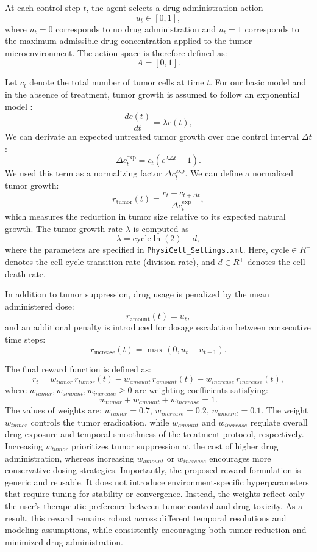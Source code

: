 \documentclass{article}
\begin{document}
At each control step $t$, the agent selects a drug administration action
$$
u_t \in [0,1],
$$
where $u_t = 0$ corresponds to no drug administration and $u_t = 1$ corresponds to the maximum admissible drug concentration applied to the tumor microenvironment.
The action space is therefore defined as:
$$
A = [0,1].
$$

Let $c_t$ denote the total number of tumor cells at time $t$.
For our basic model and in the absence of treatment, tumor growth is assumed  to follow an exponential model \cite{watanabe2016mathematical}:
$$
\frac{dc(t)}{dt} = \lambda c(t),
$$
We can derivate an expected untreated tumor growth over one control interval $\Delta t$:
$$
\Delta c_t^{\mathrm{exp}} = c_t \left( e^{\lambda \Delta t} - 1 \right).
$$
We used this term as a normalizing factor $\Delta c_t^{\mathrm{exp}}$.
We can define a normalized tumor growth:
$$
r_{\mathrm{tumor}}(t)
=
\frac{c_t - c_{t+\Delta t}}{\Delta c_t^{\mathrm{exp}}},
$$
which measures the reduction in tumor size relative to its expected natural growth.
The tumor growth rate $\lambda$ is computed as
$$
\lambda = \text{cycle} \ln(2) - d ,
$$
where the parameters are specified in \texttt{PhysiCell\_Settings.xml}.  
Here, $\text{cycle}\in R^{+}$ denotes the cell-cycle transition rate (division rate), and $d\in R^{+}$ denotes the cell death rate.



In addition to tumor suppression, drug usage is penalized by the mean administered dose:
$$
r_{\mathrm{amount}}(t) = u_t,
$$
and an additional penalty is introduced for dosage escalation between consecutive time steps:
$$
r_{\mathrm{increase}}(t) = \max(0, u_t - u_{t-1}).
$$

The final reward function is defined as:
$$
r_t
=
w_{tumor} \, r_{tumor}(t)
-
w_{amount} \, r_{amount}(t)
-
w_{increase} \, r_{increase}(t),
$$
where $w_{tumor}, w_{amount}, w_{increase} \ge 0$ are weighting coefficients satisfying:
$$
w_{tumor} + w_{amount} + w_{increase} = 1.
$$
The values of weights are: $w_{tumor} = 0.7$, $w_{increase}=0.2$, $w_{amount}=0.1$. The weight $w_{tumor}$ controls the tumor eradication, while $w_{amount}$ and $w_{increase}$ regulate overall drug exposure and temporal smoothness of the treatment protocol, respectively.
Increasing $w_{tumor}$ prioritizes tumor suppression at the cost of higher drug administration, whereas increasing $w_{amount}$ or $w_{increase}$ encourages more conservative dosing strategies.
Importantly, the proposed reward formulation is generic and reusable.
It does not introduce environment-specific hyperparameters that require tuning for stability or convergence.
Instead, the weights reflect only the user’s therapeutic preference between tumor control and drug toxicity.
As a result, this reward remains robust across different temporal resolutions and modeling assumptions,
while consistently encouraging both tumor reduction and minimized drug administration.
\end{document}
